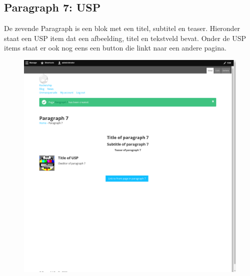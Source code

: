 \subsection{Paragraph 7: USP}
De zevende Paragraph is een blok met een titel, subtitel en teaser. Hieronder staat een USP item dat een afbeelding, titel en tekstveld bevat. Onder de USP items staat er ook nog eens een button die linkt naar een andere pagina.
\begin{figure}[h]
\includegraphics[width=1\textwidth]{img/p007.png}
\end{figure}

\clearpage
